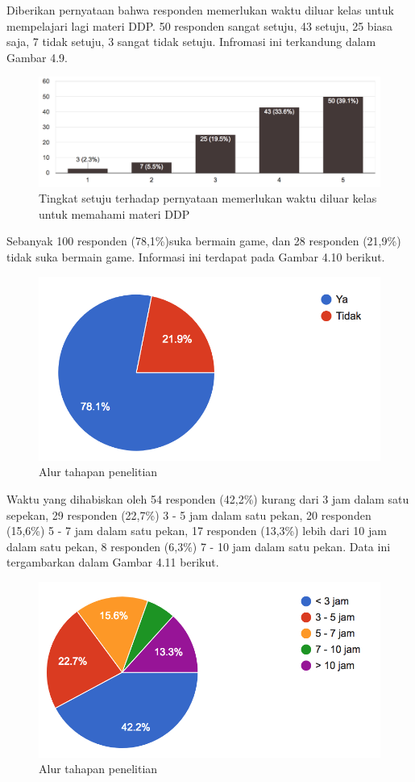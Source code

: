 	Diberikan pernyataan bahwa responden memerlukan waktu diluar kelas untuk mempelajari lagi materi DDP. 50 responden sangat setuju, 43 setuju, 25 biasa saja, 7 tidak setuju, 3 sangat tidak setuju. Infromasi ini terkandung dalam Gambar 4.9.
	\begin{figure}
		\includegraphics[width=\linewidth]{pics/perlu-waktu-luar-kelas}
		\caption{Tingkat setuju terhadap pernyataan memerlukan waktu diluar kelas untuk memahami materi DDP}
		\centering
	\end{figure}
	Sebanyak 100 responden (78,1\%)suka bermain game, dan 28 responden (21,9\%) tidak suka bermain game. Informasi ini terdapat pada Gambar 4.10 berikut.
	\begin{figure}
		\includegraphics[width=\linewidth]{pics/suka-bermain-game}
		\caption{Alur tahapan penelitian}
		\centering
	\end{figure}
	Waktu yang dihabiskan oleh 54 responden (42,2\%) kurang dari 3 jam dalam satu sepekan, 29 responden (22,7\%) 3 - 5 jam dalam satu pekan, 20 responden (15,6\%) 5 - 7 jam dalam satu pekan, 17 responden (13,3\%) lebih dari 10 jam dalam satu pekan, 8 responden (6,3\%) 7 - 10 jam dalam satu pekan. Data ini tergambarkan dalam Gambar 4.11 berikut.
	\begin{figure}
		\includegraphics[width=\linewidth]{pics/waktu-bermain-game}
		\caption{Alur tahapan penelitian}
		\centering
	\end{figure}
